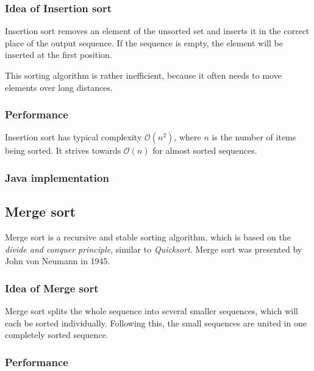 \documentclass[]{pfBook}
\newcommand{\OO}{\mathcal{O}}
\begin{document}
	\subsubsection{Idea of Insertion sort}
	
	Insertion sort removes an element of the unsorted set and inserts it in the correct place of the output sequence. If the sequence is empty, the element will be inserted at the first position.
	
	This sorting algorithm is rather inefficient, because it often needs to move elements over long distances.
	
	\subsubsection{Performance}
	
	Insertion sort has typical complexity $\OO(n^2)$, where $n$ is the number of items being sorted. It strives towards $\OO(n)$ for almost sorted sequences.
	
	\subsubsection{Java implementation}
	
	
	
	\subsection{Merge sort}
	
	Merge sort is a recursive and stable sorting algorithm, which is based on the \emph{divide and conquer principle}, similar to \emph{Quicksort}. Merge sort was presented by John von Neumann in 1945.
	
	\subsubsection{Idea of Merge sort}
	
	Merge sort splits the whole sequence into several smaller sequences, which will each be sorted individually. Following this, the small sequences are united in one completely sorted sequence.
	
	\subsubsection{Performance}
	
\end{document}

